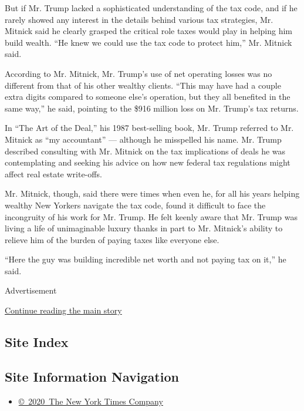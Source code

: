 But if Mr. Trump lacked a sophisticated understanding of the tax code,
and if he rarely showed any interest in the details behind various tax
strategies, Mr. Mitnick said he clearly grasped the critical role taxes
would play in helping him build wealth. ``He knew we could use the tax
code to protect him,'' Mr. Mitnick said.

According to Mr. Mitnick, Mr. Trump's use of net operating losses was no
different from that of his other wealthy clients. ``This may have had a
couple extra digits compared to someone else's operation, but they all
benefited in the same way,'' he said, pointing to the \$916 million loss
on Mr. Trump's tax returns.

In ``The Art of the Deal,'' his 1987 best-selling book, Mr. Trump
referred to Mr. Mitnick as ``my accountant'' --- although he misspelled
his name. Mr. Trump described consulting with Mr. Mitnick on the tax
implications of deals he was contemplating and seeking his advice on how
new federal tax regulations might affect real estate write-offs.

Mr. Mitnick, though, said there were times when even he, for all his
years helping wealthy New Yorkers navigate the tax code, found it
difficult to face the incongruity of his work for Mr. Trump. He felt
keenly aware that Mr. Trump was living a life of unimaginable luxury
thanks in part to Mr. Mitnick's ability to relieve him of the burden of
paying taxes like everyone else.

``Here the guy was building incredible net worth and not paying tax on
it,'' he said.

Advertisement

\protect\hyperlink{after-bottom}{Continue reading the main story}

\hypertarget{site-index}{%
\subsection{Site Index}\label{site-index}}

\hypertarget{site-information-navigation}{%
\subsection{Site Information
Navigation}\label{site-information-navigation}}

\begin{itemize}
\tightlist
\item
  \href{https://help.nytimes3xbfgragh.onion/hc/en-us/articles/115014792127-Copyright-notice}{©~2020~The
  New York Times Company}
\end{itemize}

